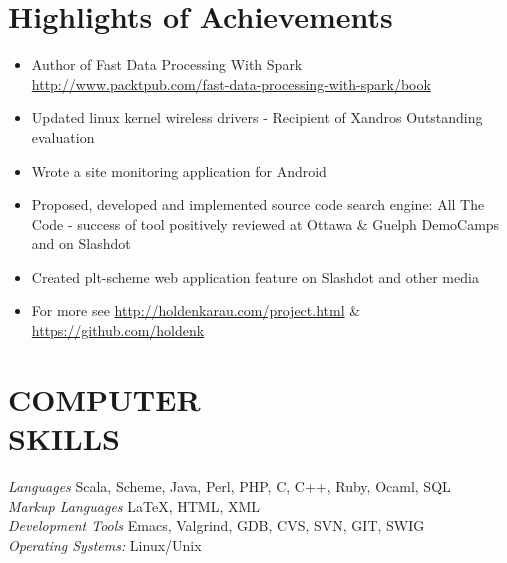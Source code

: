 \documentclass[10pt,line,margin=0.1]{newsres}
\begin{document}
\address{3407 24th St, Apt \#2, San Francisco, CA, USA}
\address{E-mail: holden@pigscanfly.ca, Cell: (425) 233-8271}
 
\begin{resume}
  
 \section{Highlights of Achievements}
\begin{itemize}  \itemsep -2pt %
\item{Author of  Fast Data Processing With Spark \\ \url{http://www.packtpub.com/fast-data-processing-with-spark/book}}
\item{Updated linux kernel wireless drivers - Recipient of Xandros Outstanding evaluation}
\item{Wrote a site monitoring application for Android}
\item{Proposed, developed and implemented source code search engine: All The Code - success of tool positively reviewed at Ottawa \& Guelph DemoCamps and on Slashdot}
\item{Created plt-scheme web application feature on Slashdot and other media}
\item{For more see \url{http://holdenkarau.com/project.html} \& \url{https://github.com/holdenk}}
\end{itemize}
\section{COMPUTER \\ SKILLS} {\sl Languages} Scala, Scheme, Java, Perl, PHP, C, C++, Ruby, Ocaml, SQL \\
                {\sl Markup Languages} \LaTeX , HTML, XML \\
                {\sl Development Tools} Emacs, Valgrind, GDB, CVS, SVN, GIT, SWIG \\
                {\sl Operating Systems:}  Linux/Unix \\
 

\end{resume}
\end{document}
